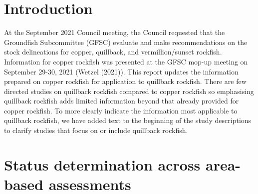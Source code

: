 \documentclass[11pt,
  english,
  letterpaper,
]{article}
\begin{document}
\newcommand{\lt}{\ensuremath <}
\newcommand{\gt}{\ensuremath >}

\pagebreak
{}
\setcounter{page}{1}

\renewcommand{\thetable}{\roman{table}}
\renewcommand{\thefigure}{\roman{figure}}

\setlength\parskip{0.5em plus 0.1em minus 0.2em}

\pagebreak
\setlength{\parskip}{5mm plus1mm minus1mm}
\setcounter{page}{1}
\renewcommand{\thefigure}{\arabic{figure}}
\renewcommand{\thetable}{\arabic{table}}
\setcounter{table}{0}
\setcounter{figure}{0}

\setlength\parskip{0.2em plus 0.1em minus 0.2em}


\hypertarget{introduction}{%
\section{Introduction}\label{introduction}}

\leavevmode\tagmcend\tagstructend


At the September 2021 Council meeting, the Council requested that the Groundfish Subcommittee (GFSC) evaluate and make recommendations on the stock delineations for copper, quillback, and vermillion/sunset rockfish. Information for copper rockfish was presented at the GFSC mop-up meeting on September 29-30, 2021 ({Wetzel (2021)\leavevmode\tagmcend\tagstructend}). This report updates the information prepared on copper rockfish for application to quillback rockfish. There are few directed studies on quillback rockfish compared to copper rockfish so emphasising quillback rockfish adds limited information beyond that already provided for copper rockfish. To more clearly indicate the information most applicable to quillback rockfish, we have added text to the beginning of the study descriptions to clarify studies that focus on or include quillback rockfish.

\leavevmode\tagmcend\tagstructend\par


\hypertarget{status-determination-across-area-based-assessments}{%
\section{Status determination across area-based assessments}\label{status-determination-across-area-based-assessments}}
\end{document}
